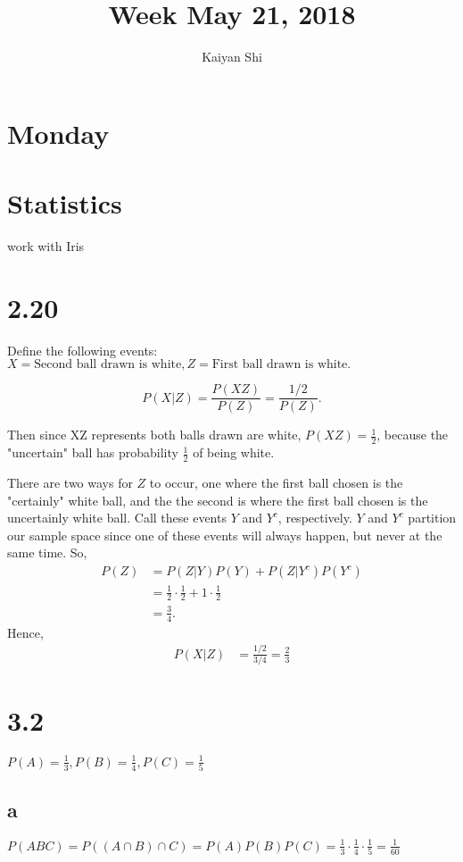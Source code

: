 \documentclass{article}
\title{Week May 21, 2018}
\author{Kaiyan Shi}
\begin{document}


\maketitle

\section*{\textcolor{Boogie}{Monday}}
\section*{Statistics} work with Iris
\section*{2.20}
Define the following events:
$X = \text{Second ball drawn is white}, Z = \text{First ball drawn is white}.$ 

$$
P(X|Z) = \frac{P(XZ)}{P(Z)} = \frac{1/2}{P(Z)}.
$$

Then since XZ represents both balls drawn are white, $P(XZ)= \frac{1}{2}$, because the "uncertain" ball has probability $\frac{1}{2}$ of being white.

There are two ways for $Z$ to occur, one where the first ball chosen is the "certainly" white ball, and the the second is where the first ball chosen is the uncertainly white ball. Call these events $Y$ and $Y^c$, respectively. $Y$ and $Y^c$ partition our sample space since one of these events will always happen, but never at the same time. So,
\begin{align*}
    P(Z) &= P(Z|Y)P(Y) + P(Z|Y^c)P(Y^c)\\
    &= \frac{1}{2}\cdot \frac{1}{2} + 1 \cdot \frac{1}{2}\\
    &= \frac{3}{4}.
\end{align*}
Hence,
\begin{align*}
    P(X|Z) &= \frac{1/2}{3/4}=\frac{2}{3}
\end{align*}


\section*{3.2} $P(A)=\frac{1}{3}, P(B) = \frac{1}{4}, P(C) = \frac{1}{5}$
\subsection*{a} $P(ABC) = P((A\cap B) \cap C) = P(A)P(B)P(C) = \frac{1}{3}\cdot \frac{1}{4} \cdot \frac{1}{5} = \frac{1}{60}$
\end{document}
